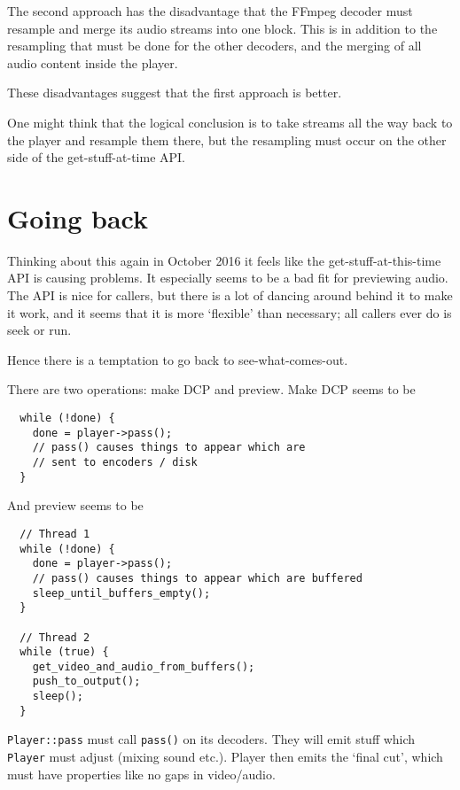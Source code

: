 \documentclass{article}
\begin{document}
The second approach has the disadvantage that the FFmpeg decoder must
resample and merge its audio streams into one block.  This is in
addition to the resampling that must be done for the other decoders,
and the merging of all audio content inside the player.

These disadvantages suggest that the first approach is better.

One might think that the logical conclusion is to take streams all the
way back to the player and resample them there, but the resampling
must occur on the other side of the get-stuff-at-time API.


\section{Going back}

Thinking about this again in October 2016 it feels like the
get-stuff-at-this-time API is causing problems.  It especially seems
to be a bad fit for previewing audio.  The API is nice for callers,
but there is a lot of dancing around behind it to make it work, and it
seems that it is more `flexible' than necessary; all callers ever do
is seek or run.

Hence there is a temptation to go back to see-what-comes-out.

There are two operations: make DCP and preview.  Make DCP seems to be

\lstset{language=C++}

\begin{lstlisting}
  while (!done) {
    done = player->pass();
    // pass() causes things to appear which are
    // sent to encoders / disk
  }
\end{lstlisting}

And preview seems to be

\begin{lstlisting}
  // Thread 1
  while (!done) {
    done = player->pass();
    // pass() causes things to appear which are buffered
    sleep_until_buffers_empty();
  }

  // Thread 2
  while (true) {
    get_video_and_audio_from_buffers();
    push_to_output();
    sleep();
  }
\end{lstlisting}

\texttt{Player::pass} must call \texttt{pass()} on its decoders.  They
will emit stuff which \texttt{Player} must adjust (mixing sound etc.).
Player then emits the `final cut', which must have properties like no
gaps in video/audio.
\end{document}
